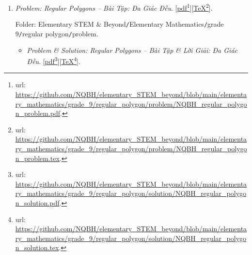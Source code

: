 \documentclass[12pt,twoside]{book}
\begin{document}
\begin{enumerate}
	Folder: {\sf Elementary STEM \& Beyond{\tt/}Elementary Mathematics{\tt/}grade 9{\tt/}circumcircle \& incircle{\tt/}problem}.
	\begin{itemize}
		\item {\it Problem \& Solution: Circumcircle \& Incircle -- Bài Tập \& Lời Giải: Đường Tròn Ngoại Tiếp \& Đường Tròn Nội Tiếp}. [\href{https://github.com/NQBH/elementary_STEM_beyond/blob/main/elementary_mathematics/grade_9/circumcircle_incircle/solution/NQBH_circumcircle_incircle_solution.pdf}{pdf}\footnote{{\sc url}: \url{https://github.com/NQBH/elementary_STEM_beyond/blob/main/elementary_mathematics/grade_9/circumcircle_incircle/solution/NQBH_circumcircle_incircle_solution.pdf}.}][\href{https://github.com/NQBH/elementary_STEM_beyond/blob/main/elementary_mathematics/grade_9/circumcircle_incircle/solution/NQBH_circumcircle_incircle_solution.tex}{\TeX}\footnote{{\sc url}: \url{https://github.com/NQBH/elementary_STEM_beyond/blob/main/elementary_mathematics/grade_9/circumcircle_incircle/solution/NQBH_circumcircle_incircle_solution.tex}.}].
		
		Folder: {\sf Elementary STEM \& Beyond{\tt/}Elementary Mathematics{\tt/}grade 9{\tt/}circumcircle \& incircle{\tt/}solution}.
	\end{itemize}
	\item {\it Problem: Regular Polygons -- Bài Tập: Đa Giác Đều}. [\href{https://github.com/NQBH/elementary_STEM_beyond/blob/main/elementary_mathematics/grade_9/regular_polygon/problem/NQBH_regular_polygon_problem.pdf}{pdf}\footnote{{\sc url}: \url{https://github.com/NQBH/elementary_STEM_beyond/blob/main/elementary_mathematics/grade_9/regular_polygon/problem/NQBH_regular_polygon_problem.pdf}.}][\href{https://github.com/NQBH/elementary_STEM_beyond/blob/main/elementary_mathematics/grade_9/regular_polygon/problem/NQBH_regular_polygon_problem.tex}{\TeX}\footnote{{\sc url}: \url{https://github.com/NQBH/elementary_STEM_beyond/blob/main/elementary_mathematics/grade_9/regular_polygon/problem/NQBH_regular_polygon_problem.tex}.}].
	
	Folder: {\sf Elementary STEM \& Beyond{\tt/}Elementary Mathematics{\tt/}grade 9{\tt/}regular polygon{\tt/}problem}.
	\begin{itemize}
		\item {\it Problem \& Solution: Regular Polygons -- Bài Tập \& Lời Giải: Đa Giác Đều}. [\href{https://github.com/NQBH/elementary_STEM_beyond/blob/main/elementary_mathematics/grade_9/regular_polygon/solution/NQBH_regular_polygon_solution.pdf}{pdf}\footnote{{\sc url}: \url{https://github.com/NQBH/elementary_STEM_beyond/blob/main/elementary_mathematics/grade_9/regular_polygon/solution/NQBH_regular_polygon_solution.pdf}.}][\href{https://github.com/NQBH/elementary_STEM_beyond/blob/main/elementary_mathematics/grade_9/regular_polygon/solution/NQBH_regular_polygon_solution.tex}{\TeX}\footnote{{\sc url}: \url{https://github.com/NQBH/elementary_STEM_beyond/blob/main/elementary_mathematics/grade_9/regular_polygon/solution/NQBH_regular_polygon_solution.tex}.}].
		

\end{itemize}
\end{enumerate}
\end{document}

